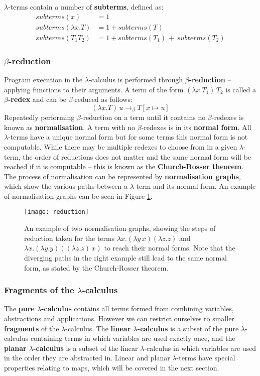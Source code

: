 \documentclass[12pt]{article}
\begin{document}
$\lambda$-terms contain a number of \textbf{subterms}, defined as:
%
\begin{align*}
    subterms(x) &= 1 \\
    subterms(\lambda x. T) &= 1 + subterms(T) \\
    subterms(T_1 T_2) &= 1 + subterms(T_1) \, + \, subterms(T_2)
\end{align*}

\subsubsection{\texorpdfstring{$\beta$}{Beta}-reduction}

Program execution in the $\lambda$-calculus is performed through \textbf{$\beta$-reduction} -- applying functions to their arguments. A term of the form $(\lambda x. T_1) \, T_2$ is called a \textbf{$\beta$-redex} and can be $\beta$-reduced as follows:
%
$$(\lambda x. T) \, u \to_\beta T[x \mapsto u]$$
%
Repeatedly performing $\beta$-reduction on a term until it contains no $\beta$-redexes is known as \textbf{normalisation}. A term with no $\beta$-redexes is in its \textbf{normal form}. All $\lambda$-terms have a unique normal form but for some terms this normal form is not computable. While there may be multiple redexes to choose from in a given $\lambda$-term, the order of reductions does not matter and the same normal form will be reached if it is computable -- this is known as the \textbf{Church-Rosser theorem}. The process of normalisation can be represented by \textbf{normalisation graphs}, which show the various paths between a $\lambda$-term and its normal form. An example of normalisation graphs can be seen in Figure \ref{fig:normgraphs}.

\begin{figure}
    \centering
    \texttt{[image: reduction]}
    \caption{An example of two normalisation graphs, showing the steps of reduction taken for the terms $\lambda x. (\lambda y \, x) (\lambda z. z)$ and $\lambda x. (\lambda y. y) ((\lambda z. z) \, x)$ to reach their normal forms. Note that the diverging paths in the right example still lead to the same normal form, as stated by the Church-Rosser theorem.}
    \label{fig:normgraphs}
\end{figure}

\subsubsection{Fragments of the \texorpdfstring{$\lambda$}{lambda}-calculus}
The \textbf{pure $\lambda$-calculus} contains all terms formed from combining variables, abstractions and applications. However we can restrict ourselves to smaller \textbf{fragments} of the $\lambda$-calculus. The \textbf{linear $\lambda$-calculus} is a subset of the pure $\lambda$-calculus containing terms in which variables are used exactly once, and the \textbf{planar $\lambda$-calculus} is a subset of the linear $\lambda$-calculus in which variables are used in the order they are abstracted in. Linear and planar $\lambda$-terms have special properties relating to maps, which will be covered in the next section.
\end{document}
